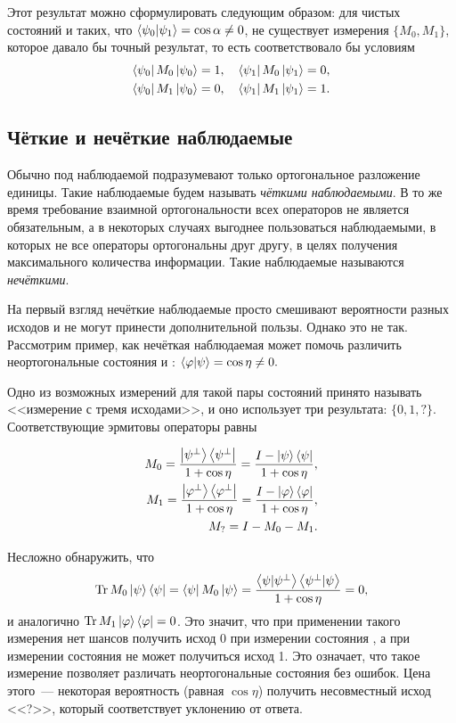 Этот результат можно сформулировать следующим образом: для чистых состояний  и  таких, что
$\left\langle \psi_0|\psi_1\right\rangle = \cos \alpha \neq 0$, не существует измерения $\{M_0, M_1\}$, которое давало бы точный результат, то есть соответствовало бы условиям
\begin{eqnarray}\label{measurement_operators_conditions}
  \left\langle \psi_0 \right| M_0 \left| \psi_0 \right\rangle = 1,\quad \left\langle \psi_1 \right| M_0 \left| \psi_1 \right\rangle = 0, \nonumber\\
  \left\langle \psi_0 \right| M_1 \left| \psi_0 \right\rangle = 0,\quad \left\langle \psi_1 \right| M_1 \left| \psi_1 \right\rangle = 1.
\end{eqnarray}

\subsection{Чёткие и нечёткие наблюдаемые}
Обычно под наблюдаемой подразумевают только ортогональное разложение единицы. Такие наблюдаемые будем называть \textit{чёткими наблюдаемыми}\cite{holevo}. В то же время требование взаимной ортогональности всех операторов не является обязательным, а в некоторых случаях выгоднее пользоваться наблюдаемыми, в которых не все операторы ортогональны друг другу, в целях получения максимального количества информации. Такие наблюдаемые называются \textit{нечёткими}.

На первый взгляд нечёткие наблюдаемые просто смешивают вероятности разных исходов и не могут принести дополнительной пользы. Однако это не так.
Рассмотрим пример, как нечёткая наблюдаемая может помочь различить неортогональные состояния \state{\varphi} и \state{\psi}: $ \left\langle \varphi|\psi\right\rangle = \cos \eta \neq 0.$

Одно из возможных измерений для такой пары состояний принято называть <<измерение с тремя исходами>>, и оно использует три результата: $\{0, 1, ?\}$. Соответствующие эрмитовы операторы равны

\begin{eqnarray}\label{unambigious_measurement}
  M_0 = \frac{\left| \psi^\bot \right\rangle\left\langle \psi^\bot \right|}{1 + \cos \eta} = \frac{I - \left| \psi \right\rangle\left\langle \psi \right|}{1 + \cos \eta}, \nonumber\\
  M_1 = \frac{\left| \varphi^\bot \right\rangle\left\langle \varphi^\bot \right|}{1 + \cos \eta} = \frac{I - \left| \varphi \right\rangle\left\langle \varphi \right|}{1 + \cos \eta}, \\
  M_? = I - M_0 - M_1. \nonumber
\end{eqnarray}

Несложно обнаружить, что 
$$ \operatorname{Tr} M_0 \left| \psi \right\rangle\left\langle \psi \right| = \left\langle \psi \right| M_0 \left| \psi \right\rangle = \frac{\left\langle \psi|\psi^\bot\right\rangle \left\langle \psi^\bot|\psi\right\rangle}{1 + \cos \eta} = 0, $$
и аналогично $\operatorname{Tr} M_1 \left| \varphi \right\rangle\left\langle \varphi \right| = 0$. Это значит, что при применении такого измерения нет шансов получить исход 0 при измерении состояния \state{\psi}, а при измерении состояния \state{\varphi} не может получиться исход 1. Это означает, что такое измерение позволяет различать неортогональные состояния без ошибок. Цена этого~--- некоторая вероятность (равная $\cos \eta$) получить несовместный исход <<?>>, который соответствует уклонению от ответа.

